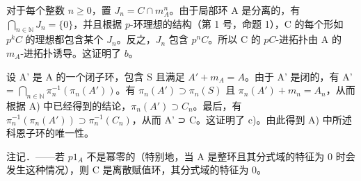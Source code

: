 对于每个整数 \(n \geqslant 0\)，置 \(J_{n} = C \cap m_{A}^{n}\)。由于局部环 A 是分离的，有 \(\bigcap_{n \in \mathbb{N}} J_{n} = \{0\}\)，并且根据 \(p\)-环理想的结构（第 1 号，命题 1），C 的每个形如 \(p^{k}C\) 的理想都包含某个 \(J_{n}\)。反之，\(J_{n}\) 包含 \(p^{n}C\)。所以 C 的 \(pC\)-进拓扑由 A 的 \(m_{A}\)-进拓扑诱导。这证明了 \(b\)。

设 A' 是 A 的一个闭子环，包含 S 且满足 \(A' + m_{A} = A\)。由于 A' 是闭的，有 A' = \(\bigcap_{n\in\mathbb{N}}\pi_n^{-1}(\pi_n(A'))\)。有 \(\pi_n(A') \supset \pi_n(S)\) 且 \(\pi_n(A') + m_n = A_n\)，从而根据 A) 中已经得到的结论，\(\pi_n(A') \supset C_n\)。最后，有 \(\pi_n^{-1}(\pi_n(A')) \supset \pi_n^{-1}(C_n)\)，从而 A' ⊃ C。这证明了 c)。由此得到 A) 中所述科恩子环的唯一性。

注记．——若 \(p1_{A}\) 不是幂零的（特别地，当 A 是整环且其分式域的特征为 0 时会发生这种情况），则 C 是离散赋值环，其分式域的特征为 0。

